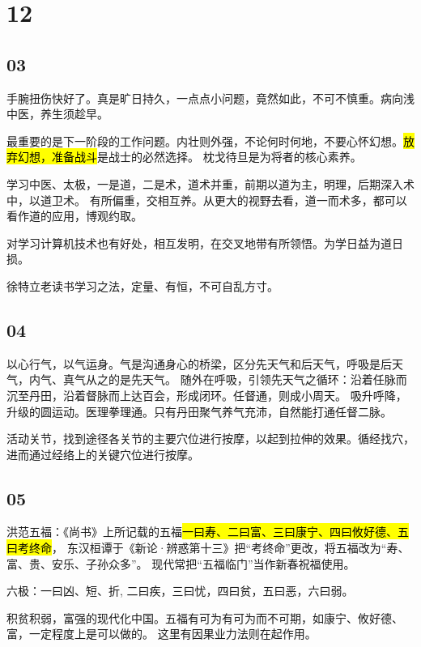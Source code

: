 \section{12}

\subsection{03}

手腕扭伤快好了。真是旷日持久，一点点小问题，竟然如此，不可不慎重。病向浅中医，养生须趁早。

最重要的是下一阶段的工作问题。内壮则外强，不论何时何地，不要心怀幻想。\hl{放弃幻想，准备战斗}是战士的必然选择。
枕戈待旦是为将者的核心素养。

学习中医、太极，一是道，二是术，道术并重，前期以道为主，明理，后期深入术中，以道卫术。
有所偏重，交相互养。从更大的视野去看，道一而术多，都可以看作道的应用，博观约取。

对学习计算机技术也有好处，相互发明，在交叉地带有所领悟。为学日益为道日损。

徐特立老读书学习之法，定量、有恒，不可自乱方寸。

\subsection{04}

以心行气，以气运身。气是沟通身心的桥梁，区分先天气和后天气，呼吸是后天气，内气、真气从之的是先天气。
随外在呼吸，引领先天气之循环：沿着任脉而沉至丹田，沿着督脉而上达百会，形成闭环。任督通，则成小周天。
吸升呼降，升级的圆运动。医理拳理通。只有丹田聚气养气充沛，自然能打通任督二脉。

活动关节，找到途径各关节的主要穴位进行按摩，以起到拉伸的效果。循经找穴，进而通过经络上的关键穴位进行按摩。

\subsection{05}

洪范五福：《尚书》上所记载的五福\hl{一曰寿、二曰富、三曰康宁、四曰攸好德、五曰考终命}，
东汉桓谭于《新论·辨惑第十三》把“考终命”更改，将五福改为“寿、富、贵、安乐、子孙众多”。
现代常把“五福临门”当作新春祝福使用。

六极：一曰凶、短、折, 二曰疾，三曰忧，四曰贫，五曰恶，六曰弱。

积贫积弱，富强的现代化中国。五福有可为有可为而不可期，如康宁、攸好德、富，一定程度上是可以做的。
这里有因果业力法则在起作用。

